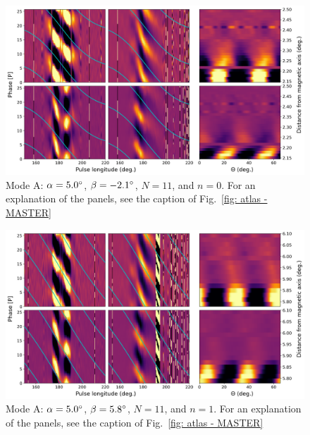 \begin{figure}
	\begin{center}
		\includegraphics[width=\atlasHeightFrac\textwidth]{Figures/B0031/atlas/A_517005011000_plots}
		\caption[Atlas results: Mode A -- $\alpha=5.0\degr$, $\beta=-2.1\degr$, $N=11$, $n=0$]{Mode A: $\alpha=5.0\degr$, $\beta=-2.1\degr$, $N=11$, and $n=0$. For an explanation of the panels, see the caption of Fig.~\ref{fig: atlas - MASTER} }
		\label{fig: atlas - A_517005011000}
	\end{center}
\end{figure}

\begin{figure}
	\begin{center}
		\includegraphics[width=\atlasHeightFrac\textwidth]{Figures/B0031/atlas/A_517005011001_plots}
		\caption[Atlas results: Mode A -- $\alpha=5.0\degr$, $\beta=5.8\degr$, $N=11$, $n=1$]{Mode A: $\alpha=5.0\degr$, $\beta=5.8\degr$, $N=11$, and $n=1$. For an explanation of the panels, see the caption of Fig.~\ref{fig: atlas - MASTER} }
		\label{fig: atlas - A_517005011001}
	\end{center}
\end{figure}

